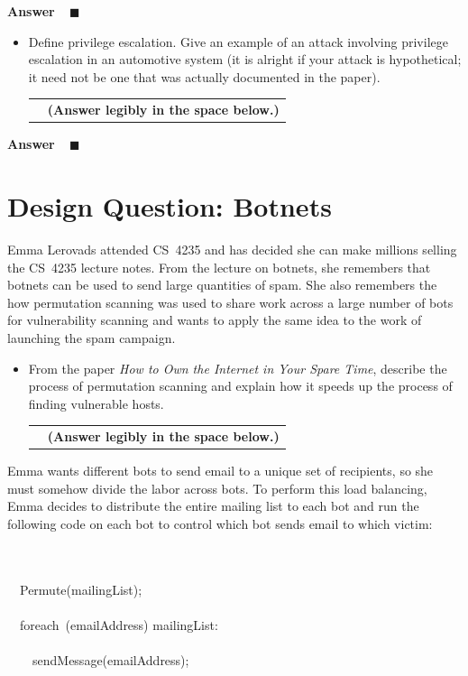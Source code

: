\documentclass[11pt]{article}
\newcounter{pctr}
\newcommand{\ansbelow}{\probnote{Answer legibly in the space below.}}
\newcommand{\sols}[1]{#1}
\newcommand{\sols}[1]{}
\newcounter{answer}
\newenvironment{answer}[1][\relax]{\refstepcounter{answer}\begin{list}%
 {}{\leftmargin 0pt\rightmargin 0pt\labelsep 3pt\parsep 0pt%
 \setlength{\listparindent}{\parindent}}
    \item {\bf Answer \theanswer #1}\
    }{\hspace*{\fill}$\blacksquare$\end{list}}
\newcommand\prob[1]%
  {\begin{itemize}\item[]%
   \vspace{.2in}{\bf\thepctr. ~[#1~ points]:}\stepcounter{pctr}}
\newcommand\eprob{\end{itemize}}
\newcommand\probnote[1]%
  {\\\begin{tabular}{cr} \hspace{3in} & {\bf (#1)} \\ \end{tabular}}
\begin{document}
\sols{
\vspace{-1.25in}
\begin{answer}
\end{answer}
}


\prob{5} Define privilege escalation.  Give an example of an attack
involving privilege escalation in an automotive system (it is alright if
your attack is hypothetical; it need not be one that was actually
documented in the paper).  \ansbelow \eprob

\sols{
\begin{answer}
\end{answer}
}



\newpage
\section{Design Question: Botnets}

Emma Lerovads attended CS~4235 and has decided she can make millions
selling the CS~4235 lecture notes.  From the lecture on botnets, she
remembers that botnets can be used to send large quantities of spam.
She also remembers the how permutation scanning was used to share work
across a large number of bots for vulnerability scanning and wants to
apply the same idea to the work of launching the spam campaign.

\prob{3}
From the paper {\em How to Own the Internet in Your Spare Time},
describe the process of permutation scanning and explain how it speeds
up the process of finding vulnerable hosts.
\ansbelow
\eprob
\vspace*{1.25in}
\sols{
\vspace{-1.25in}

}

Emma wants different bots to send email to a unique set of recipients,
so she must somehow divide the labor across bots.  To perform this load
balancing, Emma decides to distribute the entire mailing list to each
bot and run the following code on each bot to control which bot sends
email to which victim: 

\begin{center}
\begin{minipage}{4.5in}
\begin{pseudocode}[display]{}{}
\\
 \\
  ~~Permute(mailingList); \\ \\

  ~~\mbox{foreach}~(emailAddress) \in mailingList: \\ 

  ~~~~\\
  ~~~~sendMessage(emailAddress);\\
\ENDPROCEDURE
\end{pseudocode}
\end{minipage}
\end{center}
\end{document}
